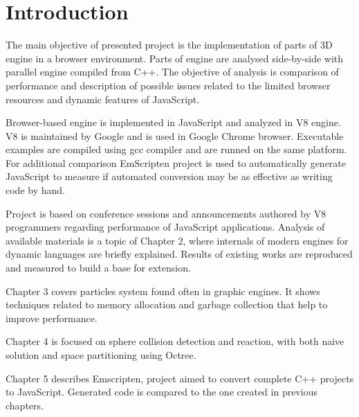 \chapter{Introduction}
\label{cha:introduction}

The main objective of presented project is the implementation of parts of 3D engine in a browser environment. Parts of engine are analysed side-by-side with parallel engine compiled from C++. The objective of analysis is comparison of performance and description of possible issues related to the limited browser resources and dynamic features of JavaScript.

Browser-based engine is implemented in JavaScript and analyzed in V8 engine. V8 is maintained by Google and is used in Google Chrome browser. Executable examples are compiled using gcc compiler and are runned on the same platform. For additional comparison EmScripten project is used to automatically generate JavaScript to measure if automated conversion may be as effective as writing code by hand.

Project is based on conference sessions and announcements authored by V8 programmers regarding performance of JavaScript applications. Analysis of available materials is a topic of Chapter 2, where internals of modern engines for dynamic languages are briefly explained. Results of existing works are reproduced and measured to build a base for extension.

Chapter 3 covers particles system found often in graphic engines. It shows techniques related to memory allocation and garbage collection that help to improve performance.

Chapter 4 is focused on sphere collision detection and reaction, with both naive solution and space partitioning using Octree.

Chapter 5 describes Emscripten, project aimed to convert complete C++ projects to JavaScript. Generated code is compared to the one created in previous chapters.


